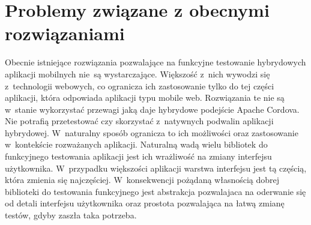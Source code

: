 \documentclass[brudnopis]{xmgr}
\begin{document}
\section{Problemy związane z obecnymi rozwiązaniami}

Obecnie istniejące rozwiązania pozwalające na funkcyjne testowanie hybrydowych aplikacji mobilnych nie~są wystarczające. Większość z~nich wywodzi się z~technologii webowych, co ogranicza ich zastosowanie tylko do tej części aplikacji, która odpowiada aplikacji typu mobile web. Rozwiązania te nie są w~stanie wykorzystać przewagi jaką daje hybrydowe podejście Apache Cordova. Nie potrafią przetestować czy skorzystać z~natywnych podwalin aplikacji hybrydowej. W~naturalny sposób ogranicza to ich możliwości oraz zastosowanie w~kontekście rozważanych aplikacji. Naturalną wadą wielu bibliotek do funkcyjnego testowania aplikacji jest ich wrażliwość na zmiany interfejsu użytkownika. W~przypadku większości aplikacji warstwa interfejsu jest tą częścią, która zmienia się najczęściej. W~konsekwencji pożądaną własnością dobrej biblioteki do testowania funkcyjnego jest abstrakcja pozwalajaca na oderwanie się od detali interfejsu użytkownika oraz prostota pozwalająca na łatwą zmianę testów, gdyby zaszła taka potrzeba. 
\end{document}

